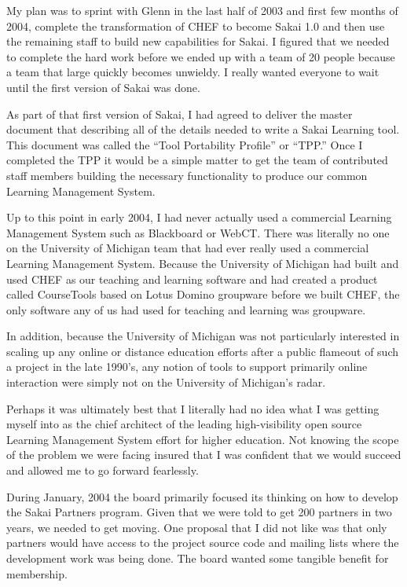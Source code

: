 \documentclass[12pt]{book}
\begin{document}
My plan was to sprint with Glenn in the last half of 2003 and first few months
of 2004, complete the transformation of CHEF to become Sakai 1.0 and then use
the remaining staff to build new capabilities for Sakai.  I figured that we needed
to complete the hard work before we ended up with a team of 20 people because
a team that large quickly becomes unwieldy.  I really wanted everyone to wait until
the first version of Sakai was done.

As part of that first version of Sakai, I had agreed to deliver the master
document that describing all of the details needed to write a Sakai
Learning tool.
This document was called the ``Tool Portability Profile'' or ``TPP.''
Once I completed the TPP it would be a
simple matter to get the team of contributed staff members
building the necessary functionality to produce
our common Learning Management System.

Up to this point in early 2004,
I had never actually used a commercial Learning Management System
such as Blackboard or WebCT.  There was literally no one on the University of
Michigan team that had ever really used a commercial Learning Management System.
Because the University of Michigan had built and used CHEF as our teaching and
learning software and had created a product called CourseTools based on Lotus Domino groupware before
we built CHEF, the only software any of us had used for teaching and learning
was groupware.

In addition, because the University of Michigan was not particularly interested
in scaling up any online or distance education efforts after a public flameout
of such a project in the late 1990's, any notion of tools to support primarily
online interaction were simply not on the University of Michigan's radar.

Perhaps it was ultimately best that I literally had no idea what I was getting
myself into as the chief architect of the leading high-visibility open source
Learning Management System effort for higher education.  Not knowing the scope
of the problem we were facing insured that I was confident that we
would succeed and allowed me to go forward fearlessly.

During January, 2004 the board primarily focused its thinking on how to develop
the Sakai Partners program.  Given that we were told to get 200 partners in
two years, we needed to get moving.  One proposal that I did not like was that
only partners would have access to the project source code and mailing lists
where the development work was being done.  The board wanted some tangible benefit
for membership.
\end{document}
